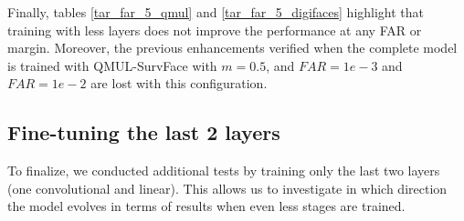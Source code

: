 \documentclass[class=report, crop=false, a4paper, 12pt]{standalone}
\begin{document}
\par Finally, tables \autoref{tar_far_5_qmul} and \autoref{tar_far_5_digifaces} highlight that training with less layers does not improve the performance at any FAR or margin. Moreover, the previous enhancements verified when the complete model is trained with QMUL-SurvFace with $m=0.5$, and $FAR=1e-3$ and $FAR=1e-2$ are lost with this configuration.


\subsection*{Fine-tuning the last 2 layers}

To finalize, we conducted additional tests by training only the last two layers (one convolutional and linear). This allows us to investigate in which direction the model evolves in terms of results when even less stages are trained.
\end{document}

